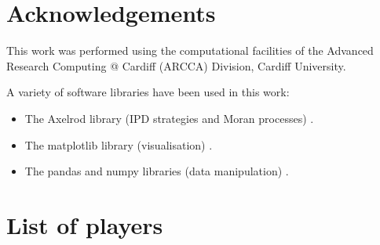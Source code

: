 \documentclass{article}
\begin{document}
\section*{Acknowledgements}

This work was performed using the computational facilities of the Advanced
Research Computing @ Cardiff (ARCCA) Division, Cardiff University.

A variety of software libraries have been used in this work:

\begin{itemize}
    \item The Axelrod library (IPD strategies and Moran processes)
        \cite{axelrodproject}.
    \item The matplotlib library (visualisation) \cite{hunter2007matplotlib}.
    \item The pandas and numpy libraries (data manipulation)
        \cite{mckinney2010data, walt2011numpy}.
\end{itemize}


\appendix

\section{List of players}\label{app:list_of_players}

\begin{multicols}{3}
	\begin{enumerate}
		
	\end{enumerate}
\end{multicols}
\end{document}
